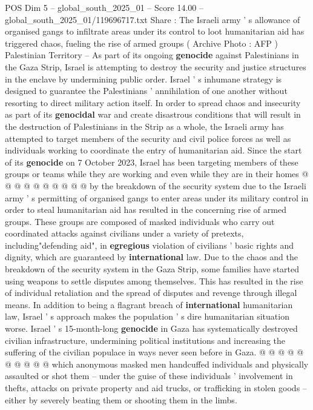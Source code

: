 \begin{textsample}{POS Dim 5 – global\_south\_2025\_01 – Score 14.00 – global\_south\_2025\_01/119696717.txt}  \label{ex:f5_pos_300}
Share : The Israeli army ' s allowance of organised gangs to infiltrate areas under its control to loot humanitarian aid has triggered chaos, fueling the rise of armed groups ( Archive Photo : AFP ) Palestinian Territory -- As part of its ongoing \textbf{genocide} against Palestinians in the Gaza Strip, Israel is attempting to destroy the security and justice structures in the enclave by undermining public order.
Israel ' s inhumane strategy is designed to guarantee the Palestinians ' annihilation of one another without resorting to direct military action itself.
In order to spread chaos and insecurity as part of its \textbf{genocidal} war and create disastrous conditions that will result in the destruction of Palestinians in the Strip as a whole, the Israeli army has attempted to target members of the security and civil police forces as well as individuals working to coordinate the entry of humanitarian aid.
Since the start of its \textbf{genocide} on 7 October 2023, Israel has been targeting members of these groups or teams while they are working and even while they are in their homes @ @ @ @ @ @ @ @ @ @ by the breakdown of the security system due to the Israeli army ' s permitting of organised gangs to enter areas under its military control in order to steal humanitarian aid has resulted in the concerning rise of armed groups.
These groups are composed of masked individuals who carry out coordinated attacks against civilians under a variety of pretexts, including"defending aid", in \textbf{egregious} violation of civilians ' basic rights and dignity, which are guaranteed by \textbf{international} law.
Due to the chaos and the breakdown of the security system in the Gaza Strip, some families have started using weapons to settle disputes among themselves.
This has resulted in the rise of individual retaliation and the spread of disputes and revenge through illegal means.
In addition to being a flagrant breach of \textbf{international} humanitarian law, Israel ' s approach makes the population ' s dire humanitarian situation worse.
Israel ' s 15-month-long \textbf{genocide} in Gaza has systematically destroyed civilian infrastructure, undermining political institutions and increasing the suffering of the civilian populace in ways never seen before in Gaza. @ @ @ @ @ @ @ @ @ @ which anonymous masked men handcuffed individuals and physically assaulted or shot them -- under the guise of these individuals ' involvement in thefts, attacks on private property and aid trucks, or trafficking in stolen goods -- either by severely beating them or shooting them in the limbs.

\end{textsample}
